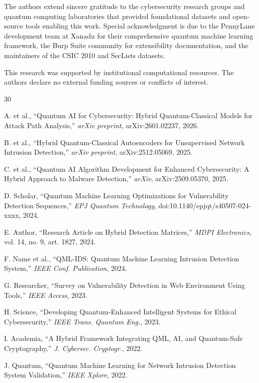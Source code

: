 \documentclass[journal,onecolumn]{IEEEtran}
\begin{document}
The authors extend sincere gratitude to the cybersecurity research groups and quantum computing laboratories that provided foundational datasets and open-source tools enabling this work. Special acknowledgment is due to the PennyLane development team at Xanadu for their comprehensive quantum machine learning framework, the Burp Suite community for extensibility documentation, and the maintainers of the CSIC 2010 and SecLists datasets.

This research was supported by institutional computational resources. The authors declare no external funding sources or conflicts of interest.


\begin{thebibliography}{30}

A. et al., ``Quantum AI for Cybersecurity: Hybrid Quantum-Classical Models for Attack Path Analysis,'' \textit{arXiv preprint}, arXiv:2601.02237, 2026.

B. et al., ``Hybrid Quantum-Classical Autoencoders for Unsupervised Network Intrusion Detection,'' \textit{arXiv preprint}, arXiv:2512.05069, 2025.

C. et al., ``Quantum AI Algorithm Development for Enhanced Cybersecurity: A Hybrid Approach to Malware Detection,'' \textit{arXiv}, arXiv:2509.05370, 2025.

D. Scholar, ``Quantum Machine Learning Optimizations for Vulnerability Detection Sequences,'' \textit{EPJ Quantum Technology}, doi:10.1140/epjqt/s40507-024-xxxx, 2024.

E. Author, ``Research Article on Hybrid Detection Matrices,'' \textit{MDPI Electronics}, vol. 14, no. 9, art. 1827, 2024.

F. Name et al., ``QML-IDS: Quantum Machine Learning Intrusion Detection System,'' \textit{IEEE Conf. Publication}, 2024.

G. Researcher, ``Survey on Vulnerability Detection in Web Environment Using Tools,'' \textit{IEEE Access}, 2023.

H. Science, ``Developing Quantum-Enhanced Intelligent Systems for Ethical Cybersecurity,'' \textit{IEEE Trans. Quantum Eng.}, 2023.

I. Academia, ``A Hybrid Framework Integrating QML, AI, and Quantum-Safe Cryptography,'' \textit{J. Cybersec. Cryptogr.}, 2022.

J. Quantum, ``Quantum Machine Learning for Network Intrusion Detection System Validation,'' \textit{IEEE Xplore}, 2022.


\end{thebibliography}
\end{document}
